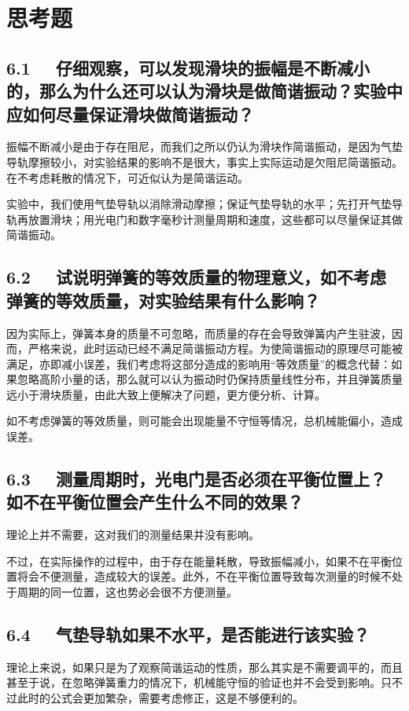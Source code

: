 \documentclass[UTF8]{article}
\theoremstyle{MyLineTheoremStyle} %
\theoremstyle{MyBlockTheoremStyle} %
\theoremstyle{MySubsubsectionStyle} %
\begin{document}
\section{思考题}

\subsection*{6.1 \ \  仔细观察，可以发现滑块的振幅是不断减小的，那么为什么还可以认为滑块是做简谐振动？实验中应如何尽量保证滑块做简谐振动？}
振幅不断减小是由于存在阻尼，而我们之所以仍认为滑块作简谐振动，是因为气垫导轨摩擦较小，对实验结果的影响不是很大，事实上实际运动是欠阻尼简谐振动。在不考虑耗散的情况下，可近似认为是简谐运动。

实验中，我们使用气垫导轨以消除滑动摩擦；保证气垫导轨的水平；先打开气垫导轨再放置滑块；用光电门和数字毫秒计测量周期和速度，这些都可以尽量保证其做简谐振动。

\subsection*{6.2 \ \  试说明弹簧的等效质量的物理意义，如不考虑弹簧的等效质量，对实验结果有什么影响？}

因为实际上，弹簧本身的质量不可忽略，而质量的存在会导致弹簧内产生驻波，因而，严格来说，此时运动已经不满足简谐振动方程。为使简谐振动的原理尽可能被满足，亦即减小误差，我们考虑将这部分造成的影响用“等效质量”的概念代替：如果忽略高阶小量的话，那么就可以认为振动时仍保持质量线性分布，并且弹簧质量远小于滑块质量，由此大致上便解决了问题，更方便分析、计算。

如不考虑弹簧的等效质量，则可能会出现能量不守恒等情况，总机械能偏小，造成误差。

\subsection*{6.3 \ \  测量周期时，光电门是否必须在平衡位置上？如不在平衡位置会产生什么不同的效果？}
理论上并不需要，这对我们的测量结果并没有影响。

不过，在实际操作的过程中，由于存在能量耗散，导致振幅减小，如果不在平衡位置将会不便测量，造成较大的误差。此外，不在平衡位置导致每次测量的时候不处于周期的同一位置，这也势必会很不方便测量。

\subsection*{6.4 \ \  气垫导轨如果不水平，是否能进行该实验？}
理论上来说，如果只是为了观察简谐运动的性质，那么其实是不需要调平的，而且甚至于说，在忽略弹簧重力的情况下，机械能守恒的验证也并不会受到影响。只不过此时的公式会更加繁杂，需要考虑修正，这是不够便利的。
\end{document}
